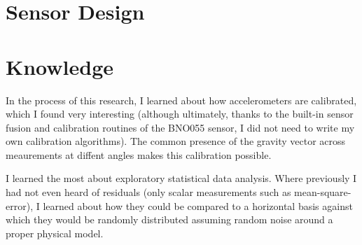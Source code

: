 \documentclass[12pt]{article}
\begin{document}


\section{Sensor Design}


\section{Knowledge}

In the process of this research, I learned about how accelerometers are calibrated, which I found
very interesting (although ultimately, thanks to the built-in sensor fusion and calibration routines of the BNO055
sensor, I did not need to write my own calibration algorithms). The common presence of the gravity
vector across meaurements at diffent angles makes this calibration possible.

I learned the most about exploratory statistical data analysis. Where previously I had not even
heard of residuals (only scalar measurements such as mean-square-error), I learned about how they
could be compared to a horizontal basis against which they would be randomly distributed assuming
random noise around a proper physical model.
\end{document}
